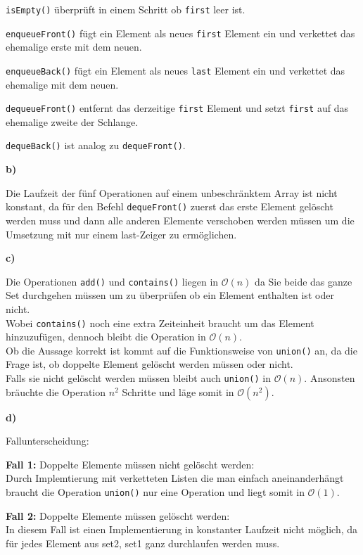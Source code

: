 \documentclass[a4paper,graphics,11pt]{article}
\begin{document}
\texttt{isEmpty()} überprüft in einem Schritt ob \texttt{first} leer ist.

\texttt{enqueueFront()} fügt ein Element als neues \texttt{first} Element ein und verkettet das ehemalige erste mit dem neuen.

\texttt{enqueueBack()} fügt ein Element als neues \texttt{last} Element ein und verkettet das ehemalige mit dem neuen.

\texttt{dequeueFront()} entfernt das derzeitige \texttt{first} Element und setzt \texttt{first} auf das ehemalige zweite der Schlange.

\texttt{dequeBack()} ist analog zu \texttt{dequeFront()}.

\textbf{b)}

Die Laufzeit der fünf Operationen auf einem unbeschränktem Array ist nicht konstant, da für den Befehl \texttt{dequeFront()} zuerst das erste Element gelöscht werden muss und dann alle anderen Elemente verschoben werden müssen um die Umsetzung mit nur einem last-Zeiger zu ermöglichen.

\textbf{c)}

Die Operationen \texttt{add()} und \texttt{contains()} liegen in $\mathcal{O}(n)$ da Sie beide das ganze Set durchgehen müssen um zu überprüfen ob ein Element enthalten ist oder nicht.\\
Wobei \texttt{contains()} noch eine extra Zeiteinheit braucht um das Element hinzuzufügen, dennoch bleibt die Operation in $\mathcal{O}(n)$.\\
Ob die Aussage korrekt ist kommt auf die Funktionsweise von \texttt{union()} an, da  die Frage ist, ob doppelte Element gelöscht werden müssen oder nicht.\\
Falls sie nicht gelöscht werden müssen bleibt auch \texttt{union()} in $\mathcal{O}(n)$. Ansonsten bräuchte die Operation $ n^2$ Schritte und läge somit in $\mathcal{O}(n^2)$.

\textbf{d)}

Fallunterscheidung:

\textbf{Fall 1:} Doppelte Elemente müssen nicht gelöscht werden:\\
Durch Implemtierung mit verketteten Listen die man einfach aneinanderhängt braucht die Operation \texttt{union()} nur eine Operation und liegt somit in $\mathcal{O}(1)$.

\textbf{Fall 2:} Doppelte Elemente müssen gelöscht werden:\\
In diesem Fall ist einen Implementierung in konstanter Laufzeit nicht möglich, da für jedes Element aus set2, set1 ganz durchlaufen werden muss.
\end{document}
